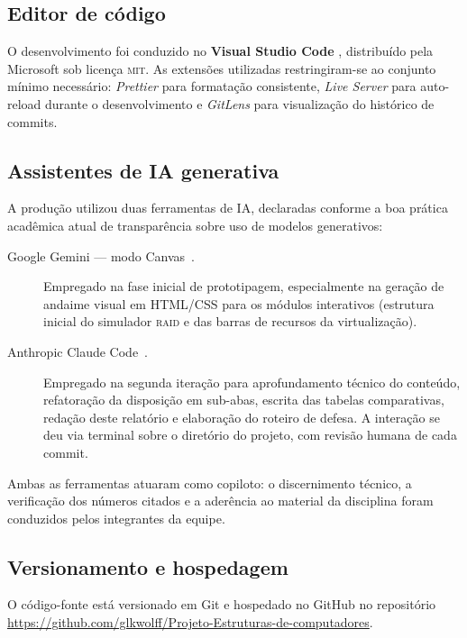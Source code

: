 \subsection{Editor de código}

O desenvolvimento foi conduzido no \textbf{Visual Studio Code}
\cite{vscode2026}, distribuído pela Microsoft sob licença
\textsc{mit}. As extensões utilizadas restringiram-se ao conjunto
mínimo necessário: \textit{Prettier} para formatação consistente,
\textit{Live Server} para auto-reload durante o desenvolvimento e
\textit{GitLens} para visualização do histórico de commits.

\subsection{Assistentes de IA generativa}

A produção utilizou duas ferramentas de IA, declaradas conforme a
boa prática acadêmica atual de transparência sobre uso de modelos
generativos:

\begin{description}
    \item[Google Gemini --- modo Canvas~\cite{gemini2026}.] Empregado
          na fase inicial de prototipagem, especialmente na geração
          de andaime visual em HTML/CSS para os módulos
          interativos (estrutura inicial do simulador \textsc{raid} e
          das barras de recursos da virtualização).
    \item[Anthropic Claude Code~\cite{claudecode2026}.] Empregado na
          segunda iteração para aprofundamento técnico do conteúdo,
          refatoração da disposição em sub-abas, escrita das tabelas
          comparativas, redação deste relatório e elaboração do
          roteiro de defesa. A interação se deu via terminal sobre
          o diretório do projeto, com revisão humana de cada commit.
\end{description}

Ambas as ferramentas atuaram como copiloto: o discernimento técnico,
a verificação dos números citados e a aderência ao material da
disciplina foram conduzidos pelos integrantes da equipe.

\subsection{Versionamento e hospedagem}

O código-fonte está versionado em \textsf{Git} e hospedado no
GitHub no repositório
\url{https://github.com/glkwolff/Projeto-Estruturas-de-computadores}.

